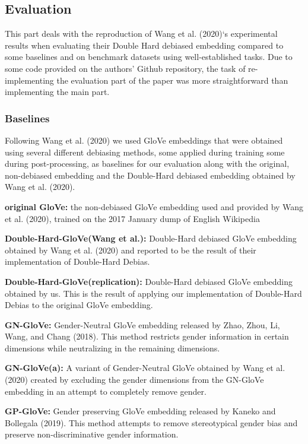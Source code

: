 \documentclass[
  english,
  man,floatsintext]{apa6}
\begin{document}
\hypertarget{evaluation}{%
\subsection{Evaluation}\label{evaluation}}

This part deals with the reproduction of Wang et al. (2020)`s experimental results when evaluating their Double Hard debiased embedding compared to some baselines and on benchmark datasets using well-established tasks. Due to some code provided on the authors' Github repository, the task of re-implementing the evaluation part of the paper was more straightforward than implementing the main part.

\hypertarget{baselines}{%
\subsubsection{Baselines}\label{baselines}}

Following Wang et al. (2020) we used GloVe embeddings that were obtained using several different debiasing methods, some applied during training some during post-processing, as baselines for our evaluation along with the original, non-debiased embedding and the Double-Hard debiased embedding obtained by Wang et al. (2020).

\textbf{original GloVe:} the non-debiased GloVe embedding used and provided by Wang et al. (2020), trained on the 2017 January dump of English Wikipedia

\textbf{Double-Hard-GloVe(Wang et al.):} Double-Hard debiased GloVe embedding obtained by Wang et al. (2020) and reported to be the result of their implementation of Double-Hard Debias.

\textbf{Double-Hard-GloVe(replication):} Double-Hard debiased GloVe embedding obtained by us. This is the result of applying our implementation of Double-Hard Debias to the original GloVe embedding.

\textbf{GN-GloVe:} Gender-Neutral GloVe embedding released by Zhao, Zhou, Li, Wang, and Chang (2018). This method restricts gender information in certain dimensions while neutralizing in the remaining dimensions.

\textbf{GN-GloVe(a):} A variant of Gender-Neutral GloVe obtained by Wang et al. (2020) created by excluding the gender dimensions from the GN-GloVe embedding in an attempt to completely remove gender.

\textbf{GP-GloVe:} Gender preserving GloVe embedding released by Kaneko and Bollegala (2019). This method attempts to remove stereotypical gender bias and preserve non-discriminative gender information.
\end{document}
